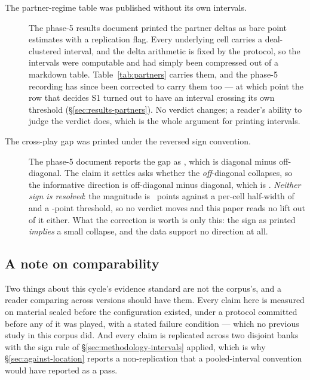 \begin{description}
\item[The partner-regime table was published without its own intervals.]
  \label{sec:corrections-intervals}
  The phase-5 results document printed the partner deltas as bare point estimates with a replication
  flag. Every underlying cell carries a deal-clustered interval, and the delta arithmetic is fixed by
  the protocol, so the intervals were computable and had simply been compressed out of a markdown
  table. Table~\ref{tab:partners} carries them, and the phase-5 recording has since been corrected to
  carry them too --- at which point the row that decides S1 turned out to have an interval crossing
  its own threshold (\S\ref{sec:results-partners}). No verdict changes; a reader's ability to judge
  the verdict does, which is the whole argument for printing intervals.

\item[The cross-play gap was printed under the reversed sign convention.] The phase-5 document reports the gap as \vsevenXpGapRecorded{}, which is diagonal minus
  off-diagonal. The claim it settles asks whether the \emph{off}-diagonal collapses, so the informative direction is off-diagonal minus diagonal, which is \vsevenXpGap{}.
  \emph{Neither sign is resolved}: the magnitude is \vsevenXpGapAbs{}~points against a per-cell
  half-width of \vsevenXpHalfWidth{} and a \vsevenStwoThreshold{}-point threshold, so no verdict
  moves and this paper reads no lift out of it either. What the correction is worth is only this:
  the sign as printed \emph{implies} a small collapse, and the data support no direction at all.

\end{description}

\subsection{A note on comparability}
\label{sec:corrections-comparability}

Two things about this cycle's evidence standard are not the corpus's, and a reader comparing across
versions should have them. Every claim here is measured on material sealed before the configuration
existed, under a protocol committed before any of it was played, with a stated failure condition ---
which no previous study in this corpus did. And every claim is replicated across two disjoint banks
with the sign rule of \S\ref{sec:methodology-intervals} applied, which is why
\S\ref{sec:against-location} reports a non-replication that a pooled-interval convention would have
reported as a pass.
